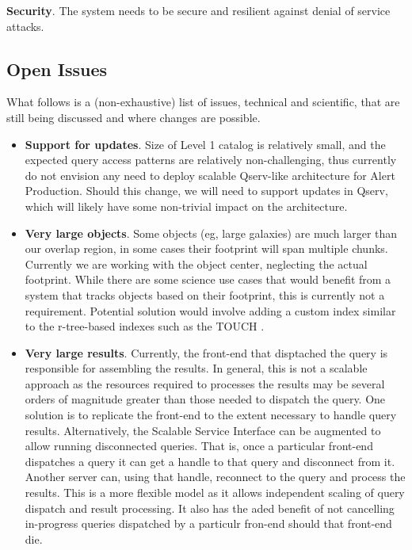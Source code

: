 \documentclass[DM,lsstdraft,toc]{lsstdoc}
\begin{document}
\textbf{Security}. The system needs to be secure and resilient against
denial of service attacks.

\subsection{Open Issues}\label{open-issues}

What follows is a (non-exhaustive) list of issues, technical and
scientific, that are still being discussed and where changes are
possible.

\begin{itemize}
\item
  \textbf{Support for updates}. Size of Level 1 catalog is relatively
  small, and the expected query access patterns are relatively
  non-challenging, thus currently do not envision any need to deploy
  scalable Qserv-like architecture for Alert Production. Should this
  change, we will need to support updates in Qserv, which will likely
  have some non-trivial impact on the architecture.
\item
  \textbf{Very large objects}. Some objects (eg, large galaxies) are
  much larger than our overlap region, in some cases their footprint
  will span multiple chunks. Currently we are working with the object
  center, neglecting the actual footprint. While there are some science
  use cases that would benefit from a system that tracks objects based
  on their footprint, this is currently not a requirement. Potential
  solution would involve adding a custom index similar to the
  r-tree-based indexes such as the TOUCH \citep{Nobari:2013:TIS:2463676.2463700}.
\item
  \textbf{Very large results}. Currently, the front-end that disptached
  the query is responsible for assembling the results. In general, this
  is not a scalable approach as the resources required to processes the
  results may be several orders of magnitude greater than those needed
  to dispatch the query. One solution is to replicate the front-end to
  the extent necessary to handle query results. Alternatively, the
  Scalable Service Interface can be augmented to allow running
  disconnected queries. That is, once a particular front-end dispatches
  a query it can get a handle to that query and disconnect from it.
  Another server can, using that handle, reconnect to the query and
  process the results. This is a more flexible model as it allows
  independent scaling of query dispatch and result processing. It also
  has the aded benefit of not cancelling in-progress queries dispatched
  by a particulr fron-end should that front-end die.
\end{itemize}
\end{document}
